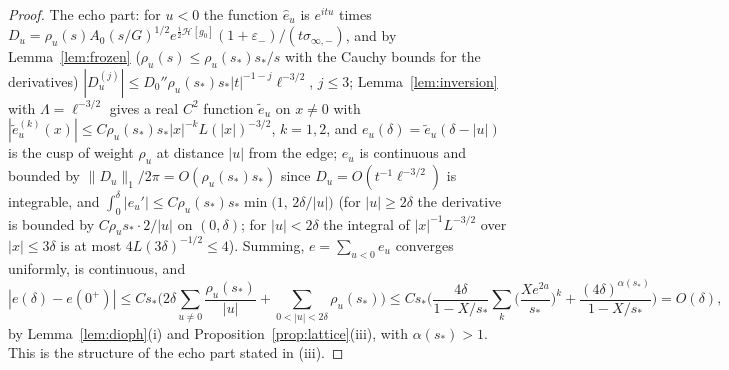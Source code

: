 \documentclass[11pt]{article}
\theoremstyle{definition}
\theoremstyle{remark}
\begin{document}
\begin{proof}
The echo part: for $u<0$ the function $\hat e_u$ is $e^{itu}$ times $D_u=\rho_u(s)A_0(s/G)^{1/2}e^{\frac i2\mathcal H[g_0]}(1+\varepsilon_-)/(t\sigma_{\infty,-})$, and by Lemma~\ref{lem:frozen} ($\rho_u(s)\le\rho_u(s_*)s_*/s$ with the Cauchy bounds for the derivatives) $|D_u^{(j)}|\le D_0''\rho_u(s_*)s_*|t|^{-1-j}\ell^{-3/2}$, $j\le3$; Lemma~\ref{lem:inversion} with $\Lambda=\ell^{-3/2}$ gives a real $C^2$ function $\tilde e_u$ on $x\ne0$ with $|\tilde e_u^{(k)}(x)|\le C\rho_u(s_*)s_*|x|^{-k}L(|x|)^{-3/2}$, $k=1,2$, and $e_u(\delta)=\tilde e_u(\delta-|u|)$ is the cusp of weight $\rho_u$ at distance $|u|$ from the edge; $e_u$ is continuous and bounded by $\|D_u\|_1/2\pi=O(\rho_u(s_*)s_*)$ since $D_u=O(t^{-1}\ell^{-3/2})$ is integrable, and $\int_0^\delta|e_u'|\le C\rho_u(s_*)s_*\min\big(1,\,2\delta/|u|\big)$ (for $|u|\ge2\delta$ the derivative is bounded by $C\rho_us_*\cdot2/|u|$ on $(0,\delta)$; for $|u|<2\delta$ the integral of $|x|^{-1}L^{-3/2}$ over $|x|\le3\delta$ is at most $4L(3\delta)^{-1/2}\le4$). Summing, $e=\sum_{u<0}e_u$ converges uniformly, is continuous, and
\[
|e(\delta)-e(0^+)|\le Cs_*\Big(2\delta\sum_{u\ne0}\frac{\rho_u(s_*)}{|u|}+\sum_{0<|u|<2\delta}\rho_u(s_*)\Big)\le Cs_*\Big(\frac{4\delta}{1-X/s_*}\sum_k\Big(\frac{Xe^{2a}}{s_*}\Big)^k+\frac{(4\delta)^{\alpha(s_*)}}{1-X/s_*}\Big)=O(\delta),
\]
by Lemma~\ref{lem:dioph}(i) and Proposition~\ref{prop:lattice}(iii), with $\alpha(s_*)>1$. This is the structure of the echo part stated in (iii).


\end{proof}
\end{document}
